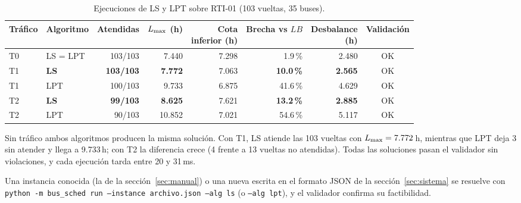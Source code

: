 \begin{table}[H]
\centering\small
\caption{Ejecuciones de LS y LPT sobre RTI-01 (103 vueltas, 35 buses).}\label{tab:rti01}
\begin{tabular}{llrrrrrc}
\toprule
Tráfico & Algoritmo & Atendidas & \makecell{$\Lmax$\\(h)} & \makecell{Cota\\inferior (h)} & \makecell{Brecha\\vs $LB$} & \makecell{Desbalance\\(h)} & Validación \\
\midrule
T0 & LS = LPT & 103/103 & 7.440 & 7.298 & 1.9\,\% & 2.480 & OK \\
\midrule
T1 & \textbf{LS} & \textbf{103/103} & \textbf{7.772} & 7.063 & \textbf{10.0\,\%} & \textbf{2.565} & OK \\
T1 & LPT & 100/103 & 9.733 & 6.875 & 41.6\,\% & 4.629 & OK \\
\midrule
T2 & \textbf{LS} & \textbf{99/103} & \textbf{8.625} & 7.621 & \textbf{13.2\,\%} & \textbf{2.885} & OK \\
T2 & LPT & 90/103 & 10.852 & 7.021 & 54.6\,\% & 5.117 & OK \\
\bottomrule
\end{tabular}
\end{table}






Sin tráfico ambos algoritmos producen la misma solución. Con T1, LS atiende las 103 vueltas con $L_{\max} = 7.772$\,h, mientras que LPT deja 3 sin atender y llega a 9.733\,h; con T2 la diferencia crece (4 frente a 13 vueltas no atendidas). Todas las soluciones pasan el validador sin violaciones, y cada ejecución tarda entre 20 y 31\,ms.

Una instancia conocida (la de la sección~\ref{sec:manual}) o una nueva escrita en el formato JSON de la sección~\ref{sec:sistema} se resuelve con \texttt{python -m bus\_sched run --instance archivo.json --alg ls} (o \texttt{--alg lpt}), y el validador confirma su factibilidad.

